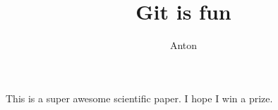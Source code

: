 \documentclass[10pt]{article}
\author{Anton}
\title{Git is fun}
\begin{document}
  \maketitle

  This is a super awesome scientific paper. I hope I win a prize.
  
\end{document}
